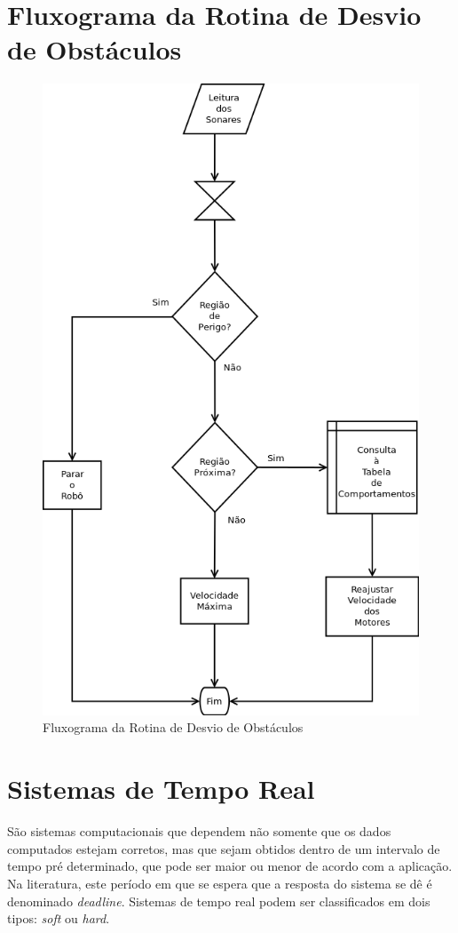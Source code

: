\section{Fluxograma da Rotina de Desvio de Obstáculos}
  \begin{figure}[!htb]
    \centering
    \includegraphics[width=0.8 \linewidth]{../../Imagens/ObstAvoid.png}
    \caption{Fluxograma da Rotina de Desvio de Obstáculos}
    \label{ObstAvoid}
  \end{figure}

\section{Sistemas de Tempo Real}
São sistemas computacionais que dependem não somente que os dados computados estejam corretos, mas que sejam obtidos dentro de um intervalo de tempo 
pré determinado, que pode ser maior ou menor de acordo com a aplicação.
Na literatura, este período em que se espera que a resposta do sistema se dê é denominado \textit{deadline}.
Sistemas de tempo real podem ser classificados em dois tipos: \textit{soft} ou \textit{hard}.

